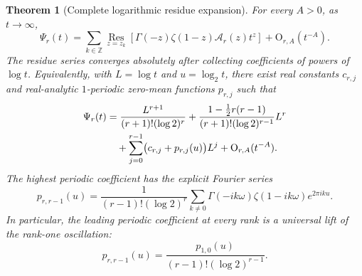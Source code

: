 \documentclass[11pt,a4paper]{article}
\theoremstyle{frontier}
\newtheorem{theorem}{Theorem}[section]
\theoremstyle{definition}
\newcommand{\Z}{\mathbb Z}
\newcommand{\Res}{\operatorname*{Res}}
\newcommand{\bigO}{\mathrm O}
\begin{document}
\begin{theorem}[Complete logarithmic residue expansion]\label{thm:residue-expansion}
For every $A>0$, as $t\to\infty$,
\begin{equation}\label{eq:residue-sum}
 \Psi_r(t)=\sum_{k\in\Z}
 \Res_{z=z_k}\left[
 \Gamma(-z)\zeta(1-z)\mathcal A_r(z)t^z
 \right]+\bigO_{r,A}(t^{-A}).
\end{equation}
The residue series converges absolutely after collecting coefficients of powers of $\log t$.  Equivalently, with $L=\log t$ and $u=\log_2t$, there exist real constants $c_{r,j}$ and real-analytic $1$-periodic zero-mean functions $p_{r,j}$ such that
\begin{align}
 \Psi_r(t)
 &=\frac{L^{r+1}}{(r+1)!(\log2)^r}
 +\frac{1-\frac12r(r-1)}{(r+1)!(\log2)^{r-1}}L^r\notag\\
 &\quad+\sum_{j=0}^{r-1}
 \bigl(c_{r,j}+p_{r,j}(u)\bigr)L^j
 +\bigO_{r,A}(t^{-A}).\label{eq:Psi-periodic-polynomial}
\end{align}
The highest periodic coefficient has the explicit Fourier series
\begin{equation}\label{eq:top-periodic-coefficient}
 p_{r,r-1}(u)=
 \frac1{(r-1)!(\log2)^r}
 \sum_{k\ne0}
 \Gamma(-ik\omega)\zeta(1-ik\omega)e^{2\pi iku}.
\end{equation}
In particular, the leading periodic coefficient at every rank is a universal lift of the rank-one oscillation:
\begin{equation}\label{eq:universal-periodic-lift}
  p_{r,r-1}(u)=
  \frac{p_{1,0}(u)}{(r-1)!(\log2)^{r-1}}.
\end{equation}
\end{theorem}
\end{document}
